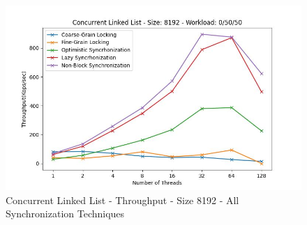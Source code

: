\documentclass[../final_report.tex]{subfiles}
\begin{document}
\begin{figure}[H]
        \includegraphics[scale=0.4]{outFiles/plots/concurrent_data_structs_all_8192_0_50_50.jpg}
    \caption{Concurrent Linked List - Throughput - Size 8192 - All Synchronization Techniques}
    \label{fig:Concurrent Linked List - Throughput - Size 8192 - All Synchronization Techniques}
\end{figure}
\end{document}
